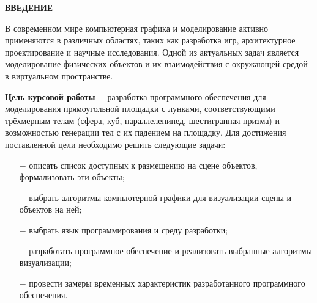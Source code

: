 \begin{center}
    \textbf{ВВЕДЕНИЕ}
\end{center}

В современном мире компьютерная графика и моделирование активно применяются в различных областях, таких как разработка игр, архитектурное проектирование и научные исследования. Одной из актуальных задач является моделирование физических объектов и их взаимодействия с окружающей средой в виртуальном пространстве.

\textbf{Цель курсовой работы} $-$ разработка программного обеспечения для моделирования прямоугольной площадки с лунками, соответствующими трёхмерным телам (сфера, куб, параллелепипед, шестигранная призма) и возможностью генерации тел с их падением на площадку. Для достижения поставленной цели необходимо решить следующие задачи:

\begin{itemize}
	\item[$-$] описать список доступных к размещению на сцене объектов, формализовать эти объекты;
	\item[$-$] выбрать алгоритмы компьютерной графики для визуализации сцены и объектов на ней;
	\item[$-$] выбрать язык программирования и среду разработки;
    \item[$-$] разработать программное обеспечение и реализовать выбранные алгоритмы визуализации;
    \item[$-$] провести замеры временных характеристик разработанного программного обеспечения.
\end{itemize}